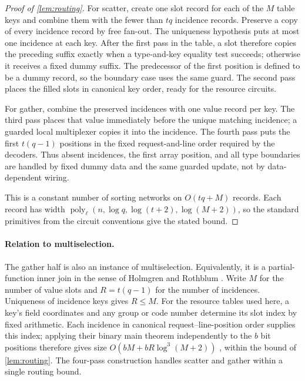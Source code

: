 \documentclass[11pt]{article}
\newcommand{\poly}{\operatorname{poly}}
\begin{document}
\begin{proof}[Proof of \cref{lem:routing}]
For scatter, create one slot record for each of the $M$ table keys and combine
them with the fewer than $tq$ incidence records.  Preserve a copy of every
incidence record by free fan-out.  The uniqueness hypothesis puts at most one
incidence at each key.  After the first pass in the table, a slot therefore
copies the preceding suffix exactly when a type-and-key equality test succeeds;
otherwise it receives a fixed dummy suffix.  The predecessor of the first
position is defined to be a dummy record, so the boundary case uses the same
guard.  The second pass places the filled slots in canonical key order,
ready for the resource circuits.

For gather, combine the preserved incidences with one value record per key.
The third pass places that value immediately before the unique matching
incidence; a guarded local multiplexer copies it into the incidence.  The
fourth pass
puts the first $t(q-1)$ positions in the fixed request-and-line order required
by the decoders.  Thus absent incidences, the first array position, and all
type boundaries are handled by fixed dummy data and the same guarded update,
not by data-dependent wiring.

This is a constant number of sorting networks on
$O(tq+M)$ records.  Each record has width
$\poly_\ell(n,\log q,\log(t+2),\log(M+2))$, so the standard primitives from the
circuit conventions give the stated bound.
\end{proof}

\paragraph{Relation to multiselection.}
The gather half is also an instance of multiselection.  Equivalently, it is a
partial-function inner join in the sense of Holmgren and Rothblum
\cite[Proposition~25 and Sections~6.1--6.2]{HolmgrenRothblum2024}.  Write
$M$ for the number of value slots and $R=t(q-1)$ for the number of
incidences.  Uniqueness of incidence keys gives $R\le M$.  For the resource
tables used here, a key's field coordinates and any group or code number
determine its slot index by fixed arithmetic.  Each incidence in canonical
request--line-position order supplies this index; applying their binary main theorem independently
to the $b$ bit positions therefore gives size
$O(bM+bR\log^3(M+2))$ \cite[Main theorem]{HolmgrenRothblum2024}, within the
bound of \cref{lem:routing}.  The four-pass construction handles scatter and
gather within a single routing bound.
\end{document}
